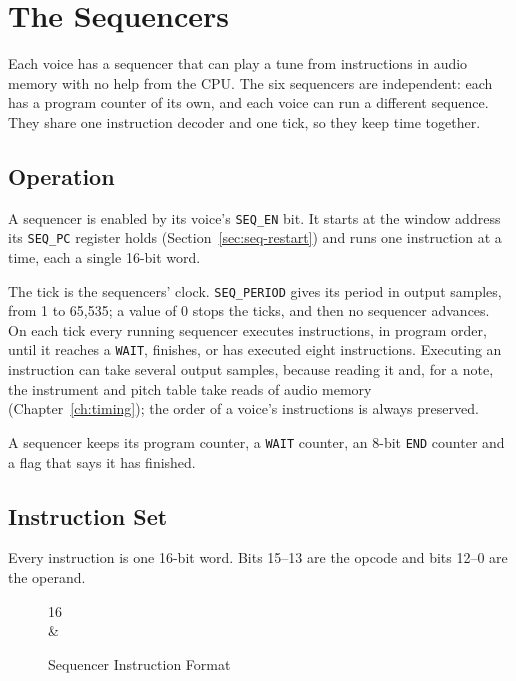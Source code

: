 \chapter{The Sequencers}
\label{ch:sequencer}

Each voice has a sequencer that can play a tune from instructions in audio memory with no help from the CPU. The six
sequencers are independent: each has a program counter of its own, and each voice can run a different sequence. They
share one instruction decoder and one tick, so they keep time together.

\section{Operation}

A sequencer is enabled by its voice's \texttt{SEQ\_EN} bit. It starts at the window address its \texttt{SEQ\_PC}
register holds (Section~\ref{sec:seq-restart}) and runs one instruction at a time, each a single 16-bit word.

The tick is the sequencers' clock. \texttt{SEQ\_PERIOD} gives its period in output samples, from 1 to 65,535; a value
of 0 stops the ticks, and then no sequencer advances. On each tick every running sequencer executes instructions, in
program order, until it reaches a \texttt{WAIT}, finishes, or has executed eight instructions. Executing an instruction
can take several output samples, because reading it and, for a note, the instrument and pitch table take reads of audio
memory (Chapter~\ref{ch:timing}); the order of a voice's instructions is always preserved.

A sequencer keeps its program counter, a \texttt{WAIT} counter, an 8-bit \texttt{END} counter and a flag that says it
has finished.

\section{Instruction Set}
\label{sec:seq-instructions}

Every instruction is one 16-bit word. Bits 15--13 are the opcode and bits 12--0 are the operand.

\begin{figure}[H]
	\centering
	\begin{bytefield}[bitwidth=2em]{16}
		 \\
		 &
	\end{bytefield}
	\caption{Sequencer Instruction Format}
	\label{fig:seq-format}
\end{figure}

